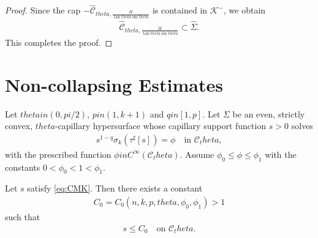 \documentclass[12pt]{amsart}
\def\theta{theta}%
\def\pi{pi}%
\def\in{in }%
\numberwithin{equation}{section}
\newcommand{\wh}{\widehat}
\newcommand{\8}{\infty}
\newcommand{\Si}{\Sigma}
\newcommand{\cC}{\mathcal{C}}
\newcommand{\cK}{\mathcal{K}}
\newcommand{\eq}[1]{\begin{equation}\begin{alignedat}{2}#1\end{alignedat}\end{equation}}
\newcommand{\Cth}{\cC_\theta}
\begin{document}
\begin{proof}
Since the cap $-\widehat{\cC}_{\theta,\frac{H}{\tan\theta\sin\theta}}$ is
contained in $\cK^-$, we obtain
\eq{
  \widehat{\cC}_{\theta,\frac{H}{\tan\theta\sin\theta}}\subset\wh{\Si}.
}
This completes the proof.
\end{proof}
\section{Non-collapsing Estimates}\label{sec:non-collapsing}
Let $\theta\in (0,\pi/2)$, $p\in (1,k+1)$ and $q\in [1,p]$. Let $\Si$ be an even, strictly convex, $\theta$-capillary hypersurface whose capillary support function $s>0$ solves
\eq{\label{eq:CMK}
s^{1-q}\sigma_k(\tau^\sharp[s])=\phi \quad \text{in }\Cth,
}
with the prescribed function $\phi\in C^{\infty}(\Cth)$. Assume $\phi_0\leq \phi\leq \phi_1$ with the constants $0<\phi_0<1<\phi_1$.

\begin{lemma}\label{lem:upper-s-bound}
Let $s$ satisfy \eqref{eq:CMK}. 
Then there exists a constant
\eq{
C_0=C_0(n,k,p,\theta,\phi_0,\phi_1)>1
}
such that 
\eq{
s\le C_0\quad\text{on }\cC_\theta.
}
\end{lemma}
\end{document}
